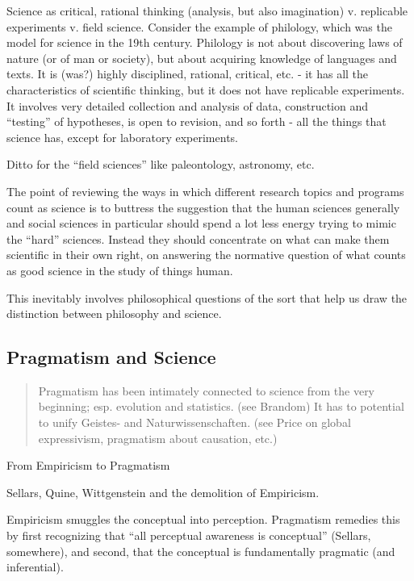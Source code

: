 \documentclass[11pt,twoside]{article}
\begin{document}
  Science as critical, rational thinking (analysis, but also
  imagination) v. replicable experiments v. field science.  Consider
  the example of philology, which was the model for science in the
  19th century.  Philology is not about discovering laws of nature (or
  of man or society), but about acquiring knowledge of languages and
  texts.  It is (was?) highly disciplined, rational, critical, etc. -
  it has all the characteristics of scientific thinking, but it does
  not have replicable experiments.  It involves very detailed
  collection and analysis of data, construction and ``testing'' of
  hypotheses, is open to revision, and so forth - all the things that
  science has, except for laboratory experiments.

  Ditto for the ``field sciences'' like paleontology, astronomy, etc.

  The point of reviewing the ways in which different research topics
  and programs count as science is to buttress the suggestion that the
  human sciences generally and social sciences in particular should
  spend a lot less energy trying to mimic the ``hard'' sciences.
  Instead they should concentrate on what can make them scientific in
  their own right, on answering the normative question of what counts
  as good science in the study of things human.

  This inevitably involves philosophical questions of the sort that
  help us draw the distinction between philosophy and science.

\subsection{Pragmatism and Science}

\begin{abstract}
  Pragmatism has been intimately connected to science from the very
  beginning; esp. evolution and statistics. (see Brandom) It has to
  potential to unify Geistes- and Naturwissenschaften. (see Price on
  global expressivism, pragmatism about causation, etc.)
\end{abstract}

From Empiricism to Pragmatism

Sellars, Quine, Wittgenstein and the demolition of Empiricism.

Empiricism smuggles the conceptual into perception.  Pragmatism
remedies this by first recognizing that ``all perceptual awareness is
conceptual'' (Sellars, somewhere), and second, that the conceptual is
fundamentally pragmatic (and inferential).
\end{document}
